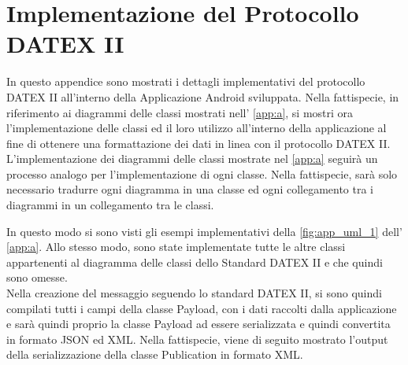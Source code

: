 \chapter{Implementazione del Protocollo DATEX II}
\label{app:b}
In questo appendice sono mostrati i dettagli implementativi del protocollo DATEX II all'interno della Applicazione Android sviluppata. Nella fattispecie, in riferimento ai diagrammi delle classi mostrati nell' \autoref{app:a}, si mostri ora l'implementazione delle classi ed il loro utilizzo all'interno della applicazione al fine di ottenere una formattazione dei dati in linea con il protocollo DATEX II. L'implementazione dei diagrammi delle classi mostrate nel \autoref{app:a} seguirà un processo analogo per l'implementazione di ogni classe. Nella fattispecie, sarà solo necessario tradurre ogni diagramma in una classe ed ogni collegamento tra i diagrammi in un collegamento tra le classi.



In questo modo si sono visti gli esempi implementativi della \autoref{fig:app_uml_1} dell' \autoref{app:a}. Allo stesso modo, sono state implementate tutte le altre classi appartenenti al diagramma delle classi dello Standard DATEX II e che quindi sono omesse.\\
Nella creazione del messaggio seguendo lo standard DATEX II, si sono quindi compilati tutti i campi della classe Payload, con i dati raccolti dalla applicazione e sarà quindi proprio la classe Payload ad essere serializzata e quindi convertita in formato JSON ed XML. Nella fattispecie, viene di seguito mostrato l'output della serializzazione della classe Publication in formato XML. 
